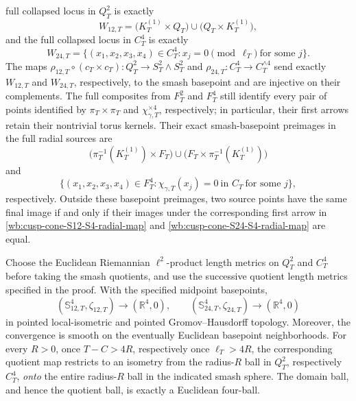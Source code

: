 \begin{theorem}
full collapsed locus in \(Q_T^2\) is exactly
\begin{equation}
 W_{12,T}
 =\bigl(K_T^{(1)}\times Q_T\bigr)
  \cup\bigl(Q_T\times K_T^{(1)}\bigr),
 \label{wb:cusp-cone-S12-exact-collapsed-locus}
\end{equation}
and the full collapsed locus in \(C_T^4\) is exactly
\begin{equation}
 W_{24,T}
 =\{(x_1,x_2,x_3,x_4)\in C_T^4:
       x_j=0\pmod{\ell_T}\ \text{for some }j\}.
 \label{wb:cusp-cone-S24-exact-collapsed-locus}
\end{equation}
The maps
\(\rho_{12,T}\circ(c_T\times c_T):Q_T^2\to
S_T^2\wedge S_T^2\) and
\(\rho_{24,T}:C_T^4\to C_T^{\wedge4}\) send exactly \(W_{12,T}\) and
\(W_{24,T}\), respectively, to the smash basepoint and are injective on
their complements.  The full composites from \(F_T^2\) and \(F_T^4\)
still identify every pair of points identified by
\(\pi_T\times\pi_T\) and \(\chi_{\gamma,T}^{\times4}\), respectively; in
particular, their first arrows retain their nontrivial torus kernels.
Their exact smash-basepoint preimages in the full radial sources are
\[
 \bigl(\pi_T^{-1}(K_T^{(1)})\times F_T\bigr)
 \cup\bigl(F_T\times\pi_T^{-1}(K_T^{(1)})\bigr)
\]
and
\[
 \{(x_1,x_2,x_3,x_4)\in F_T^4:
   \chi_{\gamma,T}(x_j)=0\ \text{in }C_T\ \text{for some }j\},
\]
respectively.  Outside these basepoint preimages, two source points have the
same final image if and only if their images under the corresponding first
arrow in \cref{wb:cusp-cone-S12-S4-radial-map} and \cref{wb:cusp-cone-S24-S4-radial-map}
are equal.

Choose the Euclidean Riemannian \(\ell^2\)-product length metrics on
\(Q_T^2\) and \(C_T^4\) before taking the smash quotients, and use the
successive quotient length metrics specified in the proof.  With the
specified midpoint basepoints,
\begin{equation}
 (\mathbb S_{12,T}^4,\zeta_{12,T})
 \longrightarrow(\mathbb R^4,0),
 \qquad
 (\mathbb S_{24,T}^4,\zeta_{24,T})
 \longrightarrow(\mathbb R^4,0)
 \label{wb:cusp-cone-moving-S4-R4-limits}
\end{equation}
in pointed local-isometric and pointed Gromov--Hausdorff topology.  Moreover,
the convergence is smooth on the eventually Euclidean basepoint
neighborhoods.  For every \(R>0\), once \(T-C>4R\), respectively once
\(\ell_T>4R\), the corresponding quotient map restricts to an isometry from
the radius-\(R\) ball in \(Q_T^2\), respectively \(C_T^4\), \emph{onto} the
entire radius-\(R\) ball in the indicated smash sphere.  The domain ball, and
hence the quotient ball, is exactly a Euclidean four-ball.
\end{theorem}



